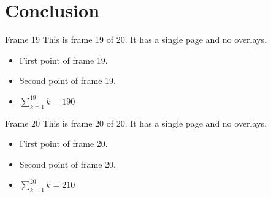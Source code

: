 \documentclass[aspectratio=169]{beamer}
\begin{document}
\section{Conclusion}
\begin{frame}{Frame 19}
  This is frame 19 of 20. It has a single page and no overlays.
  \begin{itemize}
    \item First point of frame 19.
    \item Second point of frame 19.
    \item $\sum_{k=1}^{19} k = 190$
  \end{itemize}
\end{frame}
\begin{frame}{Frame 20}
  This is frame 20 of 20. It has a single page and no overlays.
  \begin{itemize}
    \item First point of frame 20.
    \item Second point of frame 20.
    \item $\sum_{k=1}^{20} k = 210$
  \end{itemize}
\end{frame}
\end{document}
